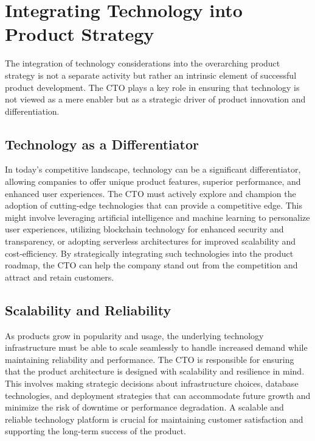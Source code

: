 \section{Integrating Technology into Product Strategy}

The integration of technology considerations into the overarching product strategy is not a separate activity but rather an intrinsic element of successful product development. The \gls{CTO} plays a key role in ensuring that technology is not viewed as a mere enabler but as a strategic driver of product innovation and differentiation.

\subsection{Technology as a Differentiator}
In today's competitive landscape, technology can be a significant differentiator, allowing companies to offer unique product features, superior performance, and enhanced user experiences. The \gls{CTO} must actively explore and champion the adoption of cutting-edge technologies that can provide a competitive edge. This might involve leveraging artificial intelligence and machine learning to personalize user experiences, utilizing blockchain technology for enhanced security and transparency, or adopting serverless architectures for improved scalability and cost-efficiency. By strategically integrating such technologies into the product roadmap, the \gls{CTO} can help the company stand out from the competition and attract and retain customers.

\subsection{Scalability and Reliability}
As products grow in popularity and usage, the underlying technology infrastructure must be able to scale seamlessly to handle increased demand while maintaining reliability and performance. The \gls{CTO} is responsible for ensuring that the product architecture is designed with scalability and resilience in mind. This involves making strategic decisions about infrastructure choices, database technologies, and deployment strategies that can accommodate future growth and minimize the risk of downtime or performance degradation. A scalable and reliable technology platform is crucial for maintaining customer satisfaction and supporting the long-term success of the product.

